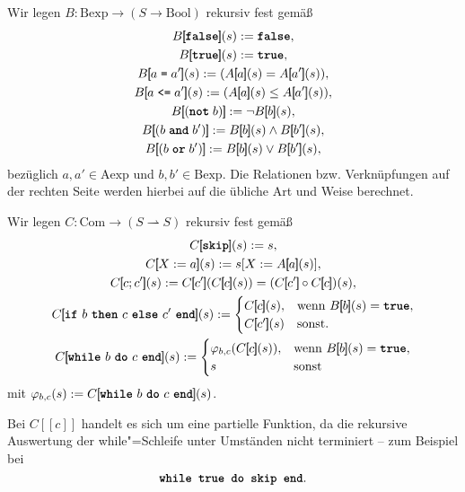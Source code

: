 \documentclass[8pt,fleqn,aspectratio=169]{beamer}
\newcommand{\parspace}{\vspace{0.8em}}
\newcommand{\kw}[1]{\textbf{\texttt{#1}}}
\newcommand{\code}[1]{\texttt{#1}}
\newcommand{\qb}[1]{[\!\![#1]\!\!]}
\newcommand{\Bool}{\mathrm{Bool}}
\newcommand{\Aexp}{\mathrm{Aexp}}
\newcommand{\Bexp}{\mathrm{Bexp}}
\newcommand{\Com}{\mathrm{Com}}
\begin{document}
\begin{frame}
Wir legen $B\colon\Bexp\to (S\to\Bool)$ rekursiv fest gemäß
\begin{gather*}
B\qb{\kw{false}}(s) := \kw{false},\\
B\qb{\kw{true}}(s) := \kw{true},\\
B\qb{a \;\code{=}\; a'}(s) := (A\qb{a}(s) = A\qb{a'}(s)),\\
B\qb{a \;\code{<=}\; a'}(s) := (A\qb{a}(s)\le A\qb{a'}(s)),\\
B\qb{(\kw{not}\;b)} := \lnot B\qb{b}(s),\\
B\qb{(b\;\kw{and}\;b')} := B\qb{b}(s)\land B\qb{b'}(s),\\
B\qb{(b\;\kw{or}\;b')} := B\qb{b}(s)\lor B\qb{b'}(s),
\end{gather*}
bezüglich $a,a'\in\Aexp$ und $b,b'\in\Bexp$. Die Relationen bzw. Verknüpfungen
auf der rechten Seite werden hierbei auf die übliche Art und Weise berechnet.
\end{frame}

\begin{frame}
Wir legen $C\colon\Com\to (S\rightharpoonup S)$ rekursiv fest gemäß
\begin{gather*}
C\qb{\kw{skip}}(s) := s,\\
C\qb{X:=a}(s) := s[X:=A\qb{a}(s)],\\
C\qb{c; c'}(s) := C\qb{c'}(C\qb{c}(s)) = (C\qb{c'}\circ C\qb{c})(s),\\
C\qb{\text{\kw{if} $b$ \kw{then} $c$ \kw{else} $c'$ \kw{end}}}(s) := \begin{cases}
C\qb{c}(s),& \text{wenn $B\qb{b}(s)=\kw{true}$},\\
C\qb{c'}(s)& \text{sonst}.
\end{cases}\\
C\qb{\text{\kw{while} $b$ \kw{do} $c$ \kw{end}}}(s) := \begin{cases}
\varphi_{b,c}(C\qb{c}(s)),& \text{wenn $B\qb{b}(s)=\kw{true}$},\\
s & \text{sonst}
\end{cases}
\end{gather*}
mit $\varphi_{b,c}(s) := C\qb{\text{\kw{while} $b$ \kw{do} $c$ \kw{end}}}(s)$.\pause

\parspace
Bei $C\qb{c}$ handelt es sich um eine partielle Funktion, da die rekursive Auswertung
der while"=Schleife unter Umständen nicht terminiert -- zum Beispiel bei
\[\texttt{\kw{while} \kw{true} \kw{do} \kw{skip} \kw{end}}.\]
\end{frame}
\end{document}
